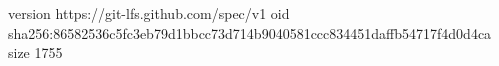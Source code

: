 version https://git-lfs.github.com/spec/v1
oid sha256:86582536c5fc3eb79d1bbcc73d714b9040581ccc834451daffb54717f4d0d4ca
size 1755
